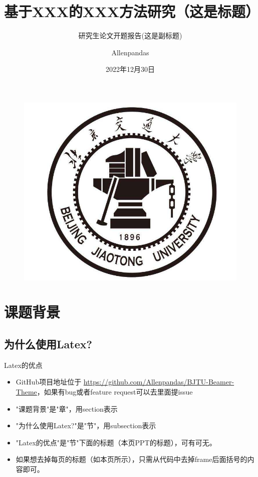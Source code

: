 \documentclass{beamer}
\author{Allenpandas}
\title{基于XXX的XXX方法研究（这是标题）}
\subtitle{研究生论文开题报告(这是副标题)}
\institute{北京交通大学XXX学院}
\date{2022年12月30日}
\begin{document}
 \kaishu
\begin{frame}
    \titlepage
    \begin{figure}[htpb]
        \begin{center}
            \includegraphics[width=0.2\linewidth]{pic/bjtu_logo.jpeg}
        \end{center}
    \end{figure}
\end{frame}


\begin{frame}
    \tableofcontents[sectionstyle=show,subsectionstyle=show/shaded/hide,subsubsectionstyle=show/shaded/hide]
\end{frame}


\section{课题背景}
\subsection{为什么使用Latex?}
\begin{frame}{Latex的优点}
    \begin{itemize}
        \item GitHub项目地址位于 \url{https://github.com/Allenpandas/BJTU-Beamer-Theme}，如果有bug或者feature request可以去里面提issue
        \item "课题背景"是"章"，用section表示
        \item "为什么使用Latex?"是"节"，用subsection表示
        \item "Latex的优点"是"节"下面的标题（本页PPT的标题），可有可无。
    \end{itemize}
\end{frame}

\begin{frame}{}
    \begin{itemize}
        \item 如果想去掉每页的标题（如本页所示），只需从代码中去掉{frame}后面括号的内容即可。
    \end{itemize}
\end{frame}
\end{document}
